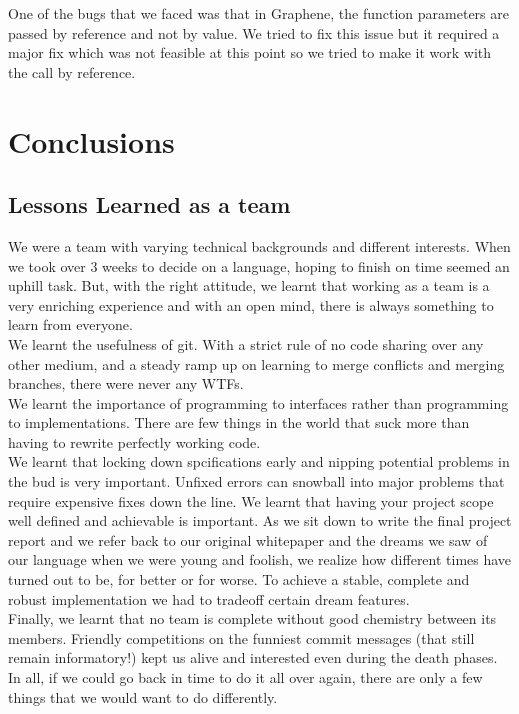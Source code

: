 \documentclass[a4paper]{article}
\begin{document}
\noindent One of the bugs that we faced was that in Graphene, the function parameters are passed by reference and not by value. We tried to fix this issue but it required a major fix which was not feasible at this point so we tried to make it work with the call by reference.\\


\newpage
\section{Conclusions}
\subsection{Lessons Learned as a team}
We were a team with varying technical backgrounds and different interests. When we took over 3 weeks to decide on a language, hoping to finish on time seemed an uphill task. But, with the right attitude, we learnt that working as a team is a very enriching experience and with an open mind, there is always something to learn from everyone.\\
We learnt the usefulness of git. With a strict rule of no code sharing over any other medium, and a steady ramp up on learning to merge conflicts and merging branches, there were never any WTFs.\\
We learnt the importance of programming to interfaces rather than programming to implementations. There are few things in the world that suck more than having to rewrite perfectly working code.\\
We learnt that locking down spcifications early and nipping potential problems in the bud is very important. Unfixed errors can snowball into major problems that require expensive fixes down the line.
We learnt that having your project scope well defined and achievable is important. As we sit down to write the final project report and we refer back to our original whitepaper and the dreams we saw of our language when we were young and foolish, we realize how different times have turned out to be, for better or for worse. To achieve a stable, complete and robust implementation we had to tradeoff certain dream features.\\
Finally, we learnt that no team is complete without good chemistry between its members. Friendly competitions on the funniest commit messages (that still remain informatory!) kept us alive and interested even during the death phases.\\
In all, if we could go back in time to do it all over again, there are only a few things that we would want to do differently.\\
\end{document}
